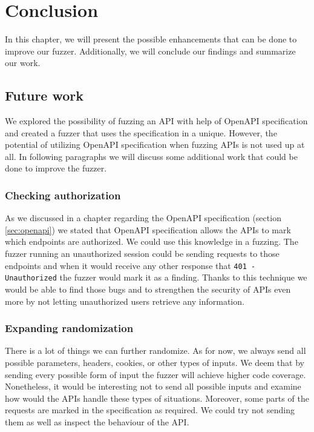 \chapter{Conclusion}
In this chapter, we will present the possible enhancements that can be done to improve our fuzzer. Additionally, we will conclude our findings and summarize our work.

\section{Future work}
We explored the possibility of fuzzing an API with help of OpenAPI specification and created a fuzzer that uses the specification in a unique. However, the potential of utilizing OpenAPI specification when fuzzing APIs is not used up at all. In following paragraphs we will discuss some additional work that could be done to improve the fuzzer.

\subsection{Checking authorization}
As we discussed in a chapter regarding the OpenAPI specification (section \ref{sec:openapi}) we stated that OpenAPI specification allows the APIs to mark which endpoints are authorized. We could use this knowledge in a fuzzing. The fuzzer running an unauthorized session could be sending requests to those endpoints and when it would receive any other response that \texttt{401 - Unauthorized} the fuzzer would mark it as a finding. Thanks to this technique we would be able to find those bugs and to strengthen the security of APIs even more by not letting unauthorized users retrieve any information.

\subsection{Expanding randomization}
There is a lot of things we can further randomize. As for now, we always send all possible parameters, headers, cookies, or other types of inputs. We deem that by sending every possible form of input the fuzzer will achieve higher code coverage. Nonetheless, it would be interesting not to send all possible inputs and examine how would the APIs handle these types of situations. Moreover, some parts of the requests are marked in the specification as required. We could try not sending them as well as inspect the behaviour of the API.

